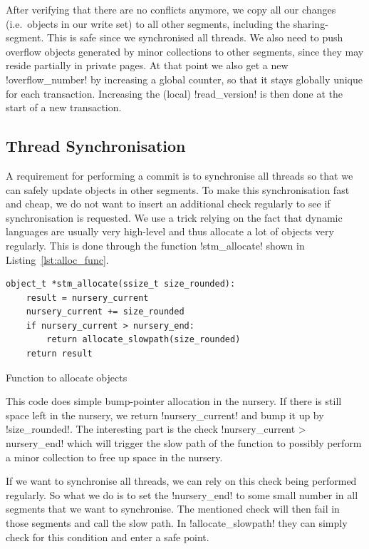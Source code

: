 \documentclass{sigplanconf}
\makeatletter
\renewcommand\lstinline[1][]{%
  \Collectverb{\@@myverb}%
}
\def\@@myverb#1{%
    \begingroup
    \fboxsep=0.2em
    \colorbox{verylightgray}{\oldlstinline|#1|}%
    \endgroup
}
\makeatother
\begin{document}
After verifying that there are no conflicts anymore, we copy all our
changes (i.e.\ objects in our write set) to all other segments,
including the sharing-segment. This is safe since we synchronised all
threads. We also need to push overflow objects generated by minor
collections to other segments, since they may reside partially in
private pages. At that point we also get a new
\lstinline!overflow_number! by increasing a global counter, so that it
stays globally unique for each transaction. Increasing the (local)
\lstinline!read_version!  is then done at the start of a new
transaction.


\subsection{Thread Synchronisation\label{subsub:sync}}

A requirement for performing a commit is to synchronise all threads so
that we can safely update objects in other segments. To make this
synchronisation fast and cheap, we do not want to insert an additional
check regularly to see if synchronisation is requested. We
use a trick relying on the fact that dynamic languages are usually
very high-level and thus allocate a lot of objects very regularly.
This is done through the function \lstinline!stm_allocate!  shown
in Listing~\ref{lst:alloc_func}.

\begin{code}[h]
\begin{lstlisting}
object_t *stm_allocate(ssize_t size_rounded):
    result = nursery_current
	nursery_current += size_rounded
	if nursery_current > nursery_end:
		return allocate_slowpath(size_rounded)
	return result
\end{lstlisting}
\caption{Function to allocate objects\label{lst:alloc_func}}
\end{code}

This code does simple bump-pointer allocation in the nursery. If there
is still space left in the nursery, we return
\lstinline!nursery_current!  and bump it up by
\lstinline!size_rounded!.  The interesting part is the check
\lstinline!nursery_current > nursery_end!  which will trigger the slow
path of the function to possibly perform a minor collection
to free up space in the nursery.

If we want to synchronise all threads, we can rely on this check being
performed regularly. So what we do is to set the
\lstinline!nursery_end!  to some small number in all segments that we
want to synchronise. The mentioned check will then fail in those
segments and call the slow path. In \lstinline!allocate_slowpath!
they can simply check for this condition and enter a safe point.
\end{document}
